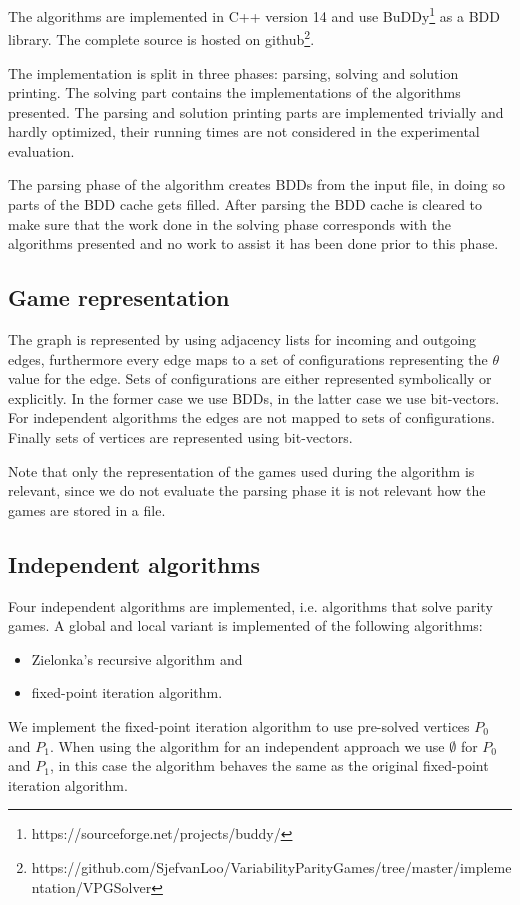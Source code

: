 The algorithms are implemented in C++ version 14 and use BuDDy\footnote{\label{note1}https://sourceforge.net/projects/buddy/} as a BDD library. The complete source is hosted on github\footnote{\label{note2}https://github.com/SjefvanLoo/VariabilityParityGames/tree/master/implementation/VPGSolver}.

The implementation is split in three phases: parsing, solving and solution printing. The solving part contains the implementations of the algorithms presented. The parsing and solution printing parts are implemented trivially and hardly optimized, their running times are not considered in the experimental evaluation.

The parsing phase of the algorithm creates BDDs from the input file, in doing so parts of the BDD cache gets filled. After parsing the BDD cache is cleared to make sure that the work done in the solving phase corresponds with the algorithms presented and no work to assist it has been done prior to this phase.

\subsection{Game representation}
The graph is represented by using adjacency lists for incoming and outgoing edges, furthermore every edge maps to a set of configurations representing the $\theta$ value for the edge. Sets of configurations are either represented symbolically or explicitly. In the former case we use BDDs, in the latter case we use bit-vectors. For independent algorithms the edges are not mapped to sets of configurations. Finally sets of vertices are represented using bit-vectors.

Note that only the representation of the games used during the algorithm is relevant, since we do not evaluate the parsing phase it is not relevant how the games are stored in a file.
\subsection{Independent algorithms}
Four independent algorithms are implemented, i.e. algorithms that solve parity games. A global and local variant is implemented of the following algorithms:
\begin{itemize}
	\item Zielonka's recursive algorithm and
	\item fixed-point iteration algorithm.
\end{itemize}
We implement the fixed-point iteration algorithm to use pre-solved vertices $P_0$ and $P_1$. When using the algorithm for an independent approach we use $\emptyset$ for $P_0$ and $P_1$, in this case the algorithm behaves the same as the original fixed-point iteration algorithm.

